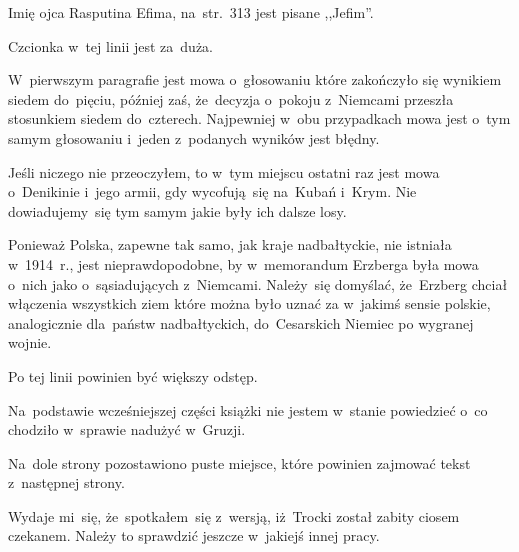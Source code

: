 \documentclass[a4paper,11pt]{article}
\begin{document}
\vspace{\spaceFour}


\start {} Imię ojca Rasputina Efima, na~str.~313 jest
pisane ,,Jefim''.

\vspace{\spaceFour}


\start {} Czcionka w~tej linii jest za~duża.

\vspace{\spaceFour}


\start {} W~pierwszym paragrafie jest mowa o~głosowaniu które
zakończyło się wynikiem siedem do~pięciu, później zaś, że~decyzja
o~pokoju z~Niemcami przeszła stosunkiem siedem do~czterech. Najpewniej
w~obu przypadkach mowa jest o~tym samym głosowaniu i~jeden z~podanych
wyników jest błędny.

\vspace{\spaceFour}


\start {} Jeśli niczego nie przeoczyłem, to w~tym miejscu
ostatni raz jest mowa o~Denikinie i~jego armii, gdy wycofują~się
na~Kubań i~Krym. Nie dowiadujemy~się tym samym jakie były ich dalsze
losy.

\vspace{\spaceFour}


\start {} Ponieważ Polska, zapewne tak samo, jak kraje
nadbałtyckie, nie istniała w~1914~r., jest nieprawdopodobne, by
w~memorandum Erzberga była mowa o~nich jako o~sąsiadujących
z~Niemcami. Należy~się domyślać, że~Erzberg chciał włączenia
wszystkich ziem które można było uznać za w~jakimś sensie polskie,
analogicznie dla~państw nadbałtyckich, do~Cesarskich Niemiec po
wygranej wojnie.

\vspace{\spaceFour}


\start {} Po tej linii powinien być większy odstęp.

\vspace{\spaceFour}


\start {} Na~podstawie wcześniejszej części książki nie
jestem w~stanie powiedzieć o~co chodziło w~sprawie nadużyć w~Gruzji.

\vspace{\spaceFour}


\start {} Na~dole strony pozostawiono puste miejsce, które
powinien zajmować tekst z~następnej strony.

\vspace{\spaceFour}


\start {} Wydaje mi~się, że~spotkałem~się z~wersją,
iż~Trocki został zabity ciosem czekanem. Należy to sprawdzić jeszcze
w~jakiejś innej pracy.
\end{document}
